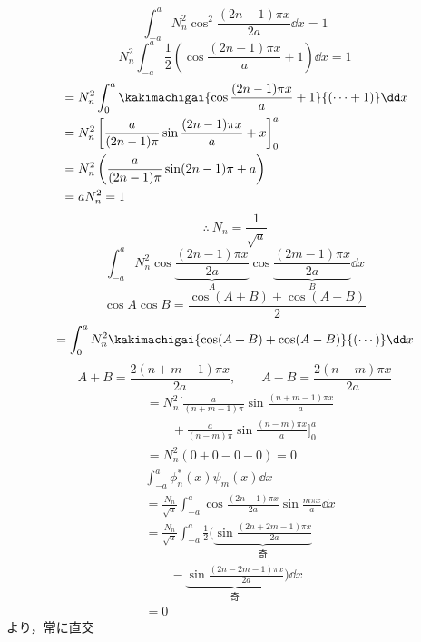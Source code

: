 \[ \int_{-a}^{a}N_{n}^{2}\cos^{2}\frac{(2n-1)\pi x}{2a}\dd x=1 \]
\[ N_{n}^{2}\int_{-a}^{a}\frac{1}{2}\left(\cos\frac{(2n-1)\pi x}{a}+1\right)\dd x=1 \]
\begin{align*}
&=N_{n}^{2}\int_{0}^{a}\kakimachigai{\cos\frac{(2n-1)\pi x}{a}+1}{(\cdots+1)}\dd x\\
&=N_{n}^{2}\left[\frac{a}{(2n-1)\pi}\sin\frac{(2n-1)\pi x}{a}+x\right]_{0}^{a}\\
&=N_{n}^{2}\left(\frac{a}{(2n-1)\pi}\sin(2n-1)\pi+a\right)\\
&=aN_{n}^{2}=1
\end{align*}
\[ \therefore\ N_{n}=\frac{1}{\sqrt{a}} \]
\[ \int_{-a}^{a}N_{n}^{2}\cos\underbrace{\frac{(2n-1)\pi x}{2a}}_{A}\cos\underbrace{\frac{(2m-1)\pi x}{2a}}_{B}\dd x \]
\[ \cos A\cos B=\frac{\cos(A+B)+\cos(A-B)}{2} \]
\[ =\int_{0}^{a}N_{n}^{2}\kakimachigai{\cos(A+B)+\cos(A-B)}{(\cdots)}\dd x \]
\[ A+B=\frac{2(n+m-1)\pi x}{2a},\qquad A-B=\frac{2(n-m)\pi x}{2a} \]
\begin{align*}
&=N_{n}^{2}\biggl[\frac{a}{(n+m-1)\pi}\sin\frac{(n+m-1)\pi x}{a}\\
&\qquad+\frac{a}{(n-m)\pi}\sin\frac{(n-m)\pi x}{a}\biggr]_{0}^{a}\\
&=N_{n}^{2}(0+0-0-0)=0
\end{align*}
\begin{align*}
&\int_{-a}^{a}\phi_{n}^{*}(x)\psi_{m}(x)\dd x\\
&=\frac{N_{n}}{\sqrt{a}}\int_{-a}^{a}\cos\frac{(2n-1)\pi x}{2a}\sin\frac{m\pi x}{a}\dd x\\
&=\frac{N_{n}}{\sqrt{a}}\int_{-a}^{a}\frac{1}{2}\biggl(\underbrace{\sin\frac{(2n+2m-1)\pi x}{2a}}_{\text{奇}}\\
&\qquad-\underbrace{\sin\frac{(2n-2m-1)\pi x}{2a}}_{\text{奇}}\biggr)\dd x\\
&=0
\end{align*}
より，常に直交
